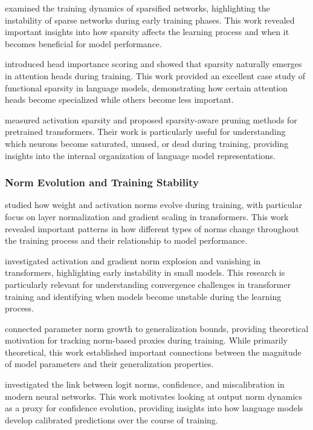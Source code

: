 \citet{evci2020rigging} examined the training dynamics of sparsified networks, highlighting the instability of sparse networks during early training phases. This work revealed important insights into how sparsity affects the learning process and when it becomes beneficial for model performance.

\citet{voita2019analyzing} introduced head importance scoring and showed that sparsity naturally emerges in attention heads during training. This work provided an excellent case study of functional sparsity in language models, demonstrating how certain attention heads become specialized while others become less important.

\citet{jiang2023pruning} measured activation sparsity and proposed sparsity-aware pruning methods for pretrained transformers. Their work is particularly useful for understanding which neurons become saturated, unused, or dead during training, providing insights into the internal organization of language model representations.

\subsubsection{Norm Evolution and Training Stability}

\citet{mishkin2016goodinit} studied how weight and activation norms evolve during training, with particular focus on layer normalization and gradient scaling in transformers. This work revealed important patterns in how different types of norms change throughout the training process and their relationship to model performance.

\citet{liu2020understanding} investigated activation and gradient norm explosion and vanishing in transformers, highlighting early instability in small models. This research is particularly relevant for understanding convergence challenges in transformer training and identifying when models become unstable during the learning process.

\citet{arora2018theoretical} connected parameter norm growth to generalization bounds, providing theoretical motivation for tracking norm-based proxies during training. While primarily theoretical, this work established important connections between the magnitude of model parameters and their generalization properties.

\citet{zhang2021calibration} investigated the link between logit norms, confidence, and miscalibration in modern neural networks. This work motivates looking at output norm dynamics as a proxy for confidence evolution, providing insights into how language models develop calibrated predictions over the course of training.

